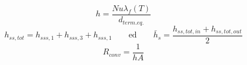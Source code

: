 \documentclass[a4paper,10pt]{article}                                                                                       %
\begin{document}
\vspace{3mm}                                                                                                                %
\begin{equation}                                                                                                            %
  \label{eqn:h}                                                                                                             %
  h = \frac{Nu\lambda_f(T)}{d_{term.eq.}}                                                                                   %
\end{equation}                                                                                                              %
\vspace{3mm}                                                                                                                %
\begin{equation}                                                                                                            %
  \label{eqn:h_s}                                                                                                           %
  h_{ss,tot} = h_{sss,1}+h_{sss,3}+h_{sss,1}                                                                                %
  \qquad\text{ed}\qquad                                                                                                     %
  \bar{h}_{s} = \frac{h_{ss,tot,in}+h_{ss,tot,out}}{2}                                                                      %
\end{equation}                                                                                                              %
\vspace{3mm}                                                                                                                %
\begin{equation}                                                                                                            %
  \label{eqn:conv_r}                                                                                                        %
  R_{conv} = \frac{1}{hA}                                                                                                   %
\end{equation}                                                                                                              %
\end{document}
